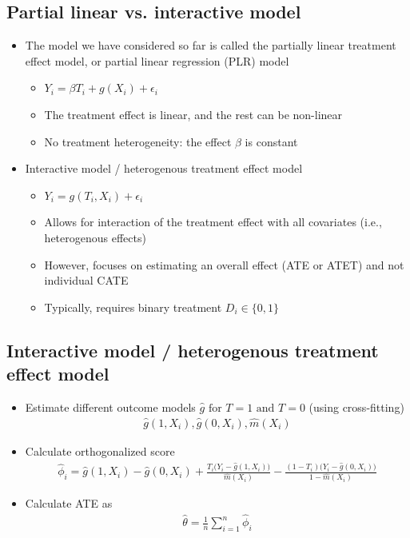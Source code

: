 \documentclass[10pt]{article}
\begin{document}
\subsection{Partial linear vs. interactive model}
\begin{itemize}
    \item The model we have considered so far is called the partially linear treatment effect model, or partial linear regression (PLR) model 
    \begin{itemize}
        \item $Y_i = \beta T_i + g(X_i) + \epsilon_i $
        \item The treatment effect is linear, and the rest can be non-linear 
        \item No treatment heterogeneity: the effect $\beta $ is constant 
    \end{itemize}
    \item Interactive model / heterogenous treatment effect model 
    \begin{itemize}
        \item $Y_i = g(T_i, X_i) + \epsilon_i $
        \item Allows for interaction of the treatment effect with all covariates (i.e., heterogenous effects)
        \item However, focuses on estimating an overall effect (ATE or ATET) and not individual CATE 
        \item Typically, requires binary treatment $D_i\in \{0, 1\} $
    \end{itemize}
\end{itemize}
\newpage 
\subsection{Interactive model / heterogenous treatment effect model}
\begin{itemize}
    \item Estimate different outcome models $\hat{g} \text{ for }T = 1 \text{ and } T = 0 $ (using cross-fitting)
    \begin{gather*}
        \hat{g}(1, X_i), \hat{g}(0, X_i), \hat{m}(X_i) 
    \end{gather*}
    \item Calculate orthogonalized score 
    \begin{gather*}
        \hat{\phi}_i = \hat{g}(1, X_i) - \hat{g}(0, X_i) + \frac{T_i\big(Y_i - \hat{g}(1, X_i)\big)}{\hat{m}(X_i)} - \frac{(1 - T_i)\big(Y_i - \hat{g}(0, X_i)\big)}{1 - \hat{m}(X_i)}
    \end{gather*}
    \item Calculate ATE as 
    \begin{gather*}
        \hat{\theta} = \frac{1}{n}\sum_{i = 1}^{n} \hat{\phi}_i
    \end{gather*}
\end{itemize}
\end{document}

